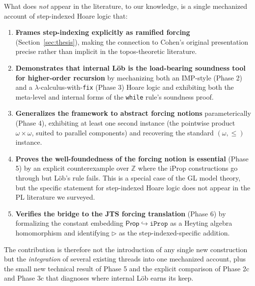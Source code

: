 \documentclass[11pt]{article}
\begin{document}
What does \emph{not} appear in the literature, to our knowledge, is
a single mechanized account of step-indexed Hoare logic that:

\begin{enumerate}

\item \textbf{Frames step-indexing explicitly as ramified forcing}
(Section~\ref{sec:thesis}), making the connection to Cohen's
original presentation precise rather than implicit in the
topos-theoretic literature.

\item \textbf{Demonstrates that internal Löb is the load-bearing
soundness tool for higher-order recursion} by mechanizing both an
IMP-style (Phase 2) and a $\lambda$-calculus-with-\texttt{fix}
(Phase 3) Hoare logic and exhibiting both the meta-level and
internal forms of the \texttt{while} rule's soundness proof.

\item \textbf{Generalizes the framework to abstract forcing notions}
parameterically (Phase 4), exhibiting at least one second
instance (the pointwise product $\omega \times \omega$, suited to
parallel components) and recovering the standard $(\omega, \le)$
instance.

\item \textbf{Proves the well-foundedness of the forcing notion is
essential} (Phase 5) by an explicit counterexample over $\mathbb{Z}$
where the iProp constructions go through but Löb's rule fails.
This is a special case of the \textsf{GL} model theory, but the
specific statement for step-indexed Hoare logic does not appear in
the PL literature we surveyed.

\item \textbf{Verifies the bridge to the JTS forcing translation}
(Phase 6) by formalizing the constant embedding
$\mathsf{Prop} \hookrightarrow \mathtt{iProp}$ as a Heyting algebra
homomorphism and identifying $\triangleright$ as the
step-indexed-specific addition.

\end{enumerate}

\noindent
The contribution is therefore not the introduction of any single new
construction but the \emph{integration} of several existing threads
into one mechanized account, plus the small new technical result of
Phase 5 and the explicit comparison of Phase 2c and Phase 3c that
diagnoses where internal Löb earns its keep.

\printbibliography
\end{document}
